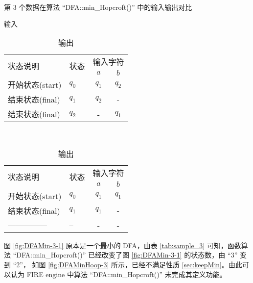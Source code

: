 \begin{table}[!htbp]
    \caption{第 3 个数据在算法 “DFA::min\_Hopcroft()” 中的输入输出对比 }
    \label{tab:sample_3}
    \centering
    \small%
    \setlength{\tabcolsep}{4pt}%
    \renewcommand{\arraystretch}{1.2}%
    \begin{subtable}[t]{0.45\textwidth}
        \centering
        \caption{输入}
        \label{tab:sample_3_origin}
        \begin{tabular}{l p{2em}<{\centering} c c}
            \toprule%
            \multirow{2}{*}{状态说明} & \multirow{2}{*}{状态} & \multicolumn{2}{c}{输入字符} \\
            \cline{3-4}      &    &$a$ & $b$  \\
            \midrule%
            开始状态(start)  & $q_0$ & $q_1$   & $q_2$   \\
            结束状态(final) & $q_1$ & $q_2$   &     -   \\
            结束状态(final) & $q_2$ & -       & $q_1$   \\
            \bottomrule%
        \end{tabular}
    \end{subtable}
    ~%
    \begin{subtable}[t]{0.45\textwidth}
        \centering
        \caption{输出}
        \label{tab:sample_3_result}
        \begin{tabular}{l p{2em}<{\centering} c c }
            \toprule%
            \multirow{2}{*}{状态说明} & \multirow{2}{*}{状态} & \multicolumn{2}{c}{输入字符} \\
            \cline{3-4}      &    & $a$ & $b$  \\
            \midrule%
            开始状态(start)  & $q_0$ & $q_1$   & $q_1$   \\
            结束状态(final) & $q_1$ & $q_1$   & -   \\
            ---------------& --& - & - \\
            \bottomrule%
        \end{tabular}
    \end{subtable}
\end{table}

图 \ref{fig:DFAMin-3-1} 原本是一个最小的 DFA，由表 \ref{tab:sample_3} 可知，函数算法 “DFA::min\_Hopcroft()” 已经改变了图 \ref{fig:DFAMin-3-1} 的状态数，由 “3” 变到 “2”， 如图 \ref{fig:DFAMinHoop-3} 所示，已经不满足性质 \ref{sec:keepMin}。由此可以认为 FIRE engine 中算法 “DFA::min\_Hopcroft()” 未完成其定义功能。

